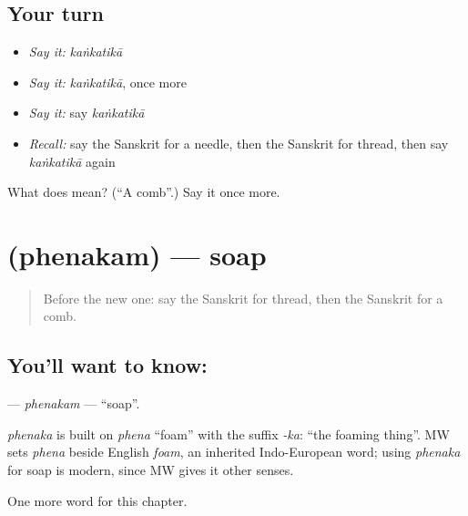 \subsection*{Your turn}
\begin{itemize}
\raggedright
  \item \emph{Say it:} \emph{kaṅkatikā}
  \item \emph{Say it:} \emph{kaṅkatikā}, once more
  \item \emph{Say it:} say \emph{kaṅkatikā}
  \item \emph{Recall:} say the Sanskrit for a needle, then the Sanskrit for thread, then say \emph{kaṅkatikā} again
\end{itemize}

\begin{tcolorbox}[breakable,colback=teal!4,colframe=teal!35!black,title={Before you move on}]
What does  mean? (\textquotedblleft{}A comb\textquotedblright{}.) Say it once more.
\end{tcolorbox}
\section[\texorpdfstring{\sk{फेनकम्} (phenakam)}{फेनकम् (phenakam)}]{ (phenakam) — soap}

\label{lesson:SA-C101-phenakam}



\begin{quote}
Before the new one: say the Sanskrit for thread, then the Sanskrit for a comb.
\end{quote}

\subsection*{You'll want to know: }
\textbf{} — \emph{phenakam} — \textquotedblleft{}soap\textquotedblright{}.

\begin{cousinweb}
\emph{phenaka} is built on \emph{phena} \textquotedblleft{}foam\textquotedblright{} with the suffix \emph{-ka}: \textquotedblleft{}the foaming thing\textquotedblright{}. MW sets \emph{phena} beside English \emph{foam}, an inherited Indo-European word; using \emph{phenaka} for soap is modern, since MW gives it other senses.
\end{cousinweb}

\begin{grammarlens}[title={What you've built}]
One more word for this chapter.
\end{grammarlens}

